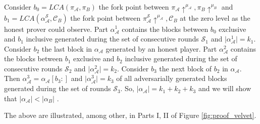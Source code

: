 
Consider $b_0 = LCA(\pi_\mathcal{A}, \pi_B)$ the fork point between $\pi_\mathcal{A} \uparrow^{\mu_\mathcal{A}}, \pi_B \uparrow^{\mu_B}$ and $b_1 = LCA
(\alpha^{\mathcal{S}}_\mathcal{A}, \mathcal{C}_B)$ the fork point between $\pi^{\mathcal{S}}_\mathcal{A} \uparrow^{\mu_\mathcal{A}}, \mathcal{C}_B $ at the zero level as the honest prover could observe. Part
$\alpha_\mathcal{A}^1$ contains the blocks between $b_0$ exclusive and $b_1$ inclusive generated during the set of consecutive rounds $\mathcal{S}_1$ and $\vert  \alpha_\mathcal{A}^1 \vert = k_1$.
Consider $b_2$ the last block in $\alpha_\mathcal{A}$ generated by an honest player. Part $\alpha_{\mathcal{A}}^2$ contains the blocks between $b_1$ exclusive and $b_2$ inclusive generated during the set of consecutive rounds $\mathcal{S}_2$ and $\vert  \alpha_\mathcal{A}^2 \vert = k_2$. 
Consider $b_3$ the next block of $b_2$ in $\alpha_\mathcal{A}$. Then $\alpha_{\mathcal{A}}^3 = \alpha_\mathcal{A}[b_3:]$ and $\vert  \alpha_\mathcal{A}^3 \vert = k_3$ of all adversarially generated blocks generated during the set of rounds $\mathcal{S}_3$. So, $\vert \alpha_\mathcal{A} \vert = k_1 + k_2 + k_3$ and we will show that $\vert \alpha_\mathcal{A} \vert < \vert \alpha_B \vert$ .

The above are illustrated, among other, in Parts I, II of Figure \ref{fig:proof_velvet}.

